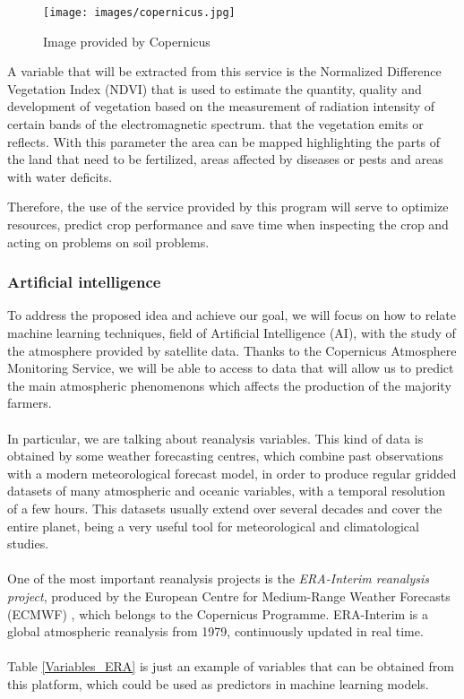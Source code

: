 \begin{itemize}
    \begin{figure}
    	\centering
    	\texttt{[image: images/copernicus.jpg]}
    	\caption{Image provided by Copernicus}
    	\label{fig:copernicus}
    \end{figure} 
    
    A variable that will be extracted from this service is the Normalized Difference Vegetation Index (NDVI) that is used to estimate the quantity, quality and development of vegetation based on the measurement of radiation intensity of certain bands of the electromagnetic spectrum. that the vegetation emits or reflects. With this parameter the area can be mapped highlighting the parts of the land that need to be fertilized, areas affected by diseases or pests and areas with water deficits.
    
    Therefore, the use of the service provided by this program will serve to optimize resources, predict crop performance and save time when inspecting the crop and acting on problems on soil problems.
    
    
\end{itemize}
\subsubsection{Artificial intelligence}
To address the proposed idea and achieve our goal, we will focus on how to relate machine learning techniques, field of Artificial Intelligence (AI), with the study of the atmosphere provided by satellite data. Thanks to the Copernicus Atmosphere Monitoring Service, we will be able to access to data that will allow us to predict the main atmospheric phenomenons which affects the production of the majority farmers.\\\\
%
In particular, we are talking about reanalysis variables. This kind of data is obtained by some weather forecasting centres, which combine past observations with a modern meteorological forecast model, in order to produce regular gridded datasets of many atmospheric and oceanic variables, with a temporal resolution of a few hours. This datasets usually extend over several decades and cover the entire planet, being a very useful tool for meteorological and climatological studies.\\\\
%
One of the most important reanalysis projects is the {\em ERA-Interim reanalysis project}, produced by the European Centre for Medium-Range Weather Forecasts (ECMWF) \cite{ERA_Interim}, which belongs to the Copernicus Programme. ERA-Interim is a global atmospheric reanalysis from 1979, continuously updated in real time.\\\\
%
Table \ref{Variables_ERA} is just an example of variables that can be obtained from this platform, which could be used as predictors in machine learning models.

